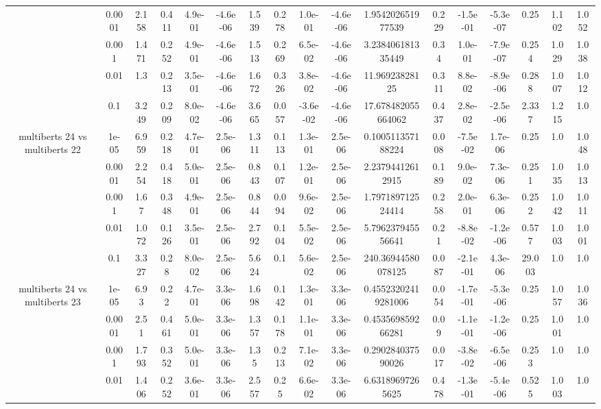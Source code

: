 \begin{tabular}{|c|c|c|c|c|c|c|c|c|c|c|c|c|c|c|c|c|}
 & 0.0001 & 2.158 & 0.411 & 4.9e-01 & -4.6e-06 & 1.539 & 0.278 & 1.0e-01 & -4.6e-06 & 1.954202651977539 & 0.229 & -1.5e-01 & -5.3e-07 & 0.25 & 1.102 & 1.052 \\
 & 0.001 & 1.471 & 0.252 & 4.9e-01 & -4.6e-06 & 1.513 & 0.269 & 6.5e-02 & -4.6e-06 & 3.238406181335449 & 0.34 & 1.0e-01 & -7.9e-07 & 0.254 & 1.029 & 1.038 \\
 & 0.01 & 1.3 & 0.213 & 3.5e-01 & -4.6e-06 & 1.672 & 0.326 & 3.8e-02 & -4.6e-06 & 11.96923828125 & 0.311 & 8.8e-02 & -8.9e-06 & 0.288 & 1.007 & 1.012 \\
 & 0.1 & 3.249 & 0.209 & 8.0e-02 & -4.6e-06 & 3.665 & 0.057 & -3.6e-02 & -4.6e-06 & 17.678482055664062 & 0.437 & 2.8e-02 & -2.5e-06 & 2.337 & 1.215 & 1.0 \\
\hline
\multirow{5}{*}{multiberts 24 vs multiberts 22} & 1e-05 & 6.959 & 0.218 & 4.7e-01 & 2.5e-06 & 1.311 & 0.113 & 1.3e-01 & 2.5e-06 & 0.100511357188224 & 0.008 & -7.5e-02 & 1.7e-06 & 0.25 & 1.0 & 1.048 \\
 & 0.0001 & 2.254 & 0.418 & 5.0e-01 & 2.5e-06 & 0.843 & 0.107 & 1.2e-01 & 2.5e-06 & 2.23794412612915 & 0.189 & 9.0e-02 & 7.3e-06 & 0.251 & 1.035 & 1.013 \\
 & 0.001 & 1.67 & 0.348 & 4.9e-01 & 2.5e-06 & 0.844 & 0.094 & 9.6e-02 & 2.5e-06 & 1.797189712524414 & 0.258 & 2.0e-01 & 6.3e-06 & 0.252 & 1.042 & 1.011 \\
 & 0.01 & 1.072 & 0.126 & 3.5e-01 & 2.5e-06 & 2.792 & 0.104 & 5.5e-02 & 2.5e-06 & 5.796237945556641 & 0.21 & -8.8e-02 & -1.2e-06 & 0.577 & 1.003 & 1.001 \\
 & 0.1 & 3.327 & 0.28 & 8.0e-02 & 2.5e-06 & 5.624 & 0.1 & 5.6e-02 & 2.5e-06 & 240.36944580078125 & 0.087 & -2.1e-01 & 4.3e-06 & 29.003 & 1.0 & 1.0 \\
\hline
\multirow{5}{*}{multiberts 24 vs multiberts 23} & 1e-05 & 6.93 & 0.22 & 4.7e-01 & 3.3e-06 & 1.698 & 0.142 & 1.3e-01 & 3.3e-06 & 0.45523202419281006 & 0.054 & -1.7e-01 & -5.3e-06 & 0.25 & 1.057 & 1.036 \\
 & 0.0001 & 2.51 & 0.461 & 5.0e-01 & 3.3e-06 & 1.357 & 0.178 & 1.1e-01 & 3.3e-06 & 0.453569859266281 & 0.09 & -1.1e-01 & -1.2e-06 & 0.25 & 1.001 & 1.0 \\
 & 0.001 & 1.793 & 0.352 & 5.0e-01 & 3.3e-06 & 1.35 & 0.213 & 7.1e-02 & 3.3e-06 & 0.290284037590026 & 0.017 & -3.8e-02 & -6.5e-06 & 0.253 & 1.0 & 1.0 \\
 & 0.01 & 1.406 & 0.252 & 3.6e-01 & 3.3e-06 & 2.557 & 0.25 & 6.6e-02 & 3.3e-06 & 6.63189697265625 & 0.478 & -1.3e-01 & -5.4e-06 & 0.525 & 1.003 & 1.0 \\

\end{tabular}
